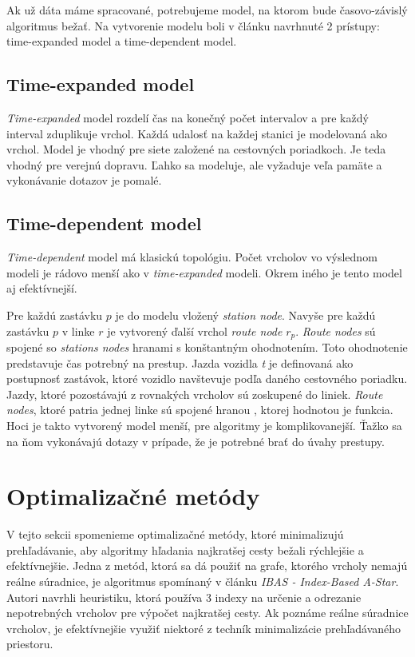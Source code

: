 Ak už dáta máme spracované, potrebujeme model, na ktorom bude časovo-závislý algoritmus bežať. Na vytvorenie modelu boli v článku \cite{models} navrhnuté 2 prístupy: time-expanded model a time-dependent model.

\subsection{Time-expanded model}
\textit{Time-expanded} model rozdelí čas na konečný počet intervalov a pre každý interval zduplikuje vrchol. Každá udalosť na každej stanici je modelovaná ako vrchol. Model je vhodný pre siete založené na cestovných poriadkoch. Je teda vhodný pre verejnú dopravu. Ľahko sa modeluje, ale vyžaduje veľa pamäte a vykonávanie dotazov je pomalé.

\subsection{Time-dependent model}
\textit{Time-dependent} model má klasickú topológiu. Počet vrcholov vo výslednom modeli je rádovo menší ako v \textit{time-expanded} modeli. Okrem iného je tento model aj efektívnejší. 

Pre každú zastávku $p$ je do modelu vložený \textit{station node}. Navyše pre každú zastávku $p$ v linke $r$ je vytvorený ďalší vrchol \textit{route node} $r_p$. \textit{Route nodes} sú spojené so \textit{stations nodes} hranami s konštantným ohodnotením. Toto ohodnotenie predstavuje čas potrebný na prestup. Jazda vozidla \textit{t} je definovaná ako postupnosť zastávok, ktoré vozidlo navštevuje podľa daného cestovného poriadku. Jazdy, ktoré pozostávajú z rovnakých vrcholov sú zoskupené do liniek. \textit{Route nodes}, ktoré patria jednej linke sú spojené hranou , ktorej hodnotou je funkcia. Hoci je takto vytvorený model menší, pre algoritmy je komplikovanejší. Ťažko sa na ňom vykonávajú dotazy v prípade, že je potrebné brať do úvahy prestupy.


\section{Optimalizačné metódy}
\label{sec:optimalization}
V tejto sekcii spomenieme optimalizačné metódy, ktoré minimalizujú prehľadávanie, aby algoritmy hľadania najkratšej cesty bežali rýchlejšie a efektívnejšie. Jedna z metód, ktorá sa dá použiť na grafe, ktorého vrcholy nemajú reálne súradnice, je algoritmus spomínaný v článku \textit{IBAS - Index-Based A-Star}. Autori navrhli heuristiku, ktorá používa 3 indexy na určenie a odrezanie nepotrebných vrcholov pre výpočet najkratšej cesty. Ak poznáme reálne súradnice vrcholov, je efektívnejšie využiť niektoré z techník minimalizácie prehľadávaného priestoru.

